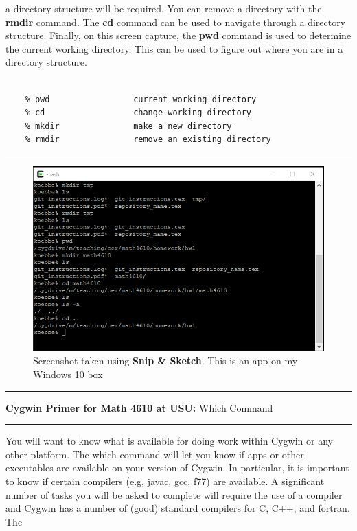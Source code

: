 \documentclass[10pt,fleqn]{article}
\begin{document}
a directory structure will be required. You can remove a directory with the
{\bf rmdir} command. The {\bf cd} command can be used to navigate through a
directory structure. Finally, on this screen capture, the {\bf pwd} command is
used to determine the current working directory. This can be used to figure out
where you are in a directory structure.
\begin{verbatim}

    % pwd                 current working directory
    % cd                  change working directory
    % mkdir               make a new directory
    % rmdir               remove an existing directory

\end{verbatim}
\vskip0.1in\hrule\vskip0.1in
\vfill
\begin{figure}[h]
\centering
\includegraphics{../images/cygwin_03.png}
\caption{{Screenshot} taken using {\bf Snip \& Sketch}. This is an app on
         my Windows 10 box}
\end{figure}
\eject
\vskip0.1in\hrule\vskip0.1in
\noindent
{{\bf Cygwin Primer for Math 4610 at USU:} Which Command} 
\vskip0.1in\hrule\vskip0.1in
\noindent
You will want to know what is available for doing work within Cygwin or any
other platform. The which command will let you know if apps or other executables
are available on your version of Cygwin. In particular, it is important to know
if certain compilers (e.g, javac, gcc, f77) are available. A significant number
of tasks you will be asked to complete will require the use of a compiler and
Cygwin has a number of (good) standard compilers for C, C++, and fortran. The
\end{document}
